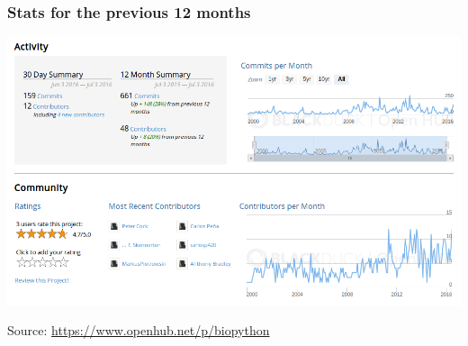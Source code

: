 \documentclass[trans]{beamer}
\begin{document}
{
  \frametitle{Stats for the previous 12 months}

  \begin{center}
  \includegraphics[width=1.0\textwidth]{openhub-bp-activity-community.png}
  \end{center}
  \small{Source: \url{https://www.openhub.net/p/biopython}}
}
\frame
\end{document}
